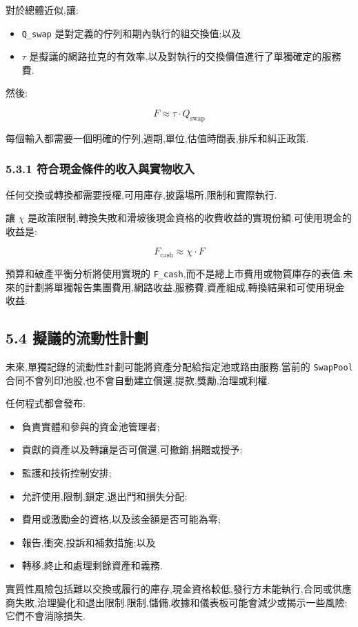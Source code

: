 \documentclass[11pt]{article}
\begin{document}
對於總體近似,讓:

\begin{itemize}[leftmargin=*]
\item \texttt{Q\_swap} 是對定義的佇列和期內執行的組交換值;以及
\item \texttt{$\tau$} 是擬議的網路拉克的有效率,以及對執行的交換價值進行了單獨確定的服務費.
\end{itemize}
然後:

\[
F \approx \tau \cdot Q_{\mathrm{swap}}
\]

每個輸入都需要一個明確的佇列,週期,單位,估值時間表,排斥和糾正政策.

\subsubsection*{5.3.1 符合現金條件的收入與實物收入}

任何交換或轉換都需要授權,可用庫存,披露場所,限制和實際執行.

讓 \texttt{$\chi$} 是政策限制,轉換失敗和滑坡後現金資格的收費收益的實現份額.可使用現金的收益是:

\[
F_{\mathrm{cash}} \approx \chi \cdot F
\]

預算和破產平衡分析將使用實現的 \texttt{F\_cash},而不是總上市費用或物質庫存的表值.未來的計劃將單獨報告集團費用,網路收益,服務費,資產組成,轉換結果和可使用現金收益.

\subsection*{5.4 擬議的流動性計劃}

未來,單獨記錄的流動性計劃可能將資產分配給指定池或路由服務.當前的 \texttt{SwapPool} 合同不會列印池股,也不會自動建立償還,提款,獎勵,治理或利權.

任何程式都會發布:

\begin{itemize}[leftmargin=*]
\item 負責實體和參與的資金池管理者;
\item 貢獻的資產以及轉讓是否可償還,可撤銷,捐贈或授予;
\item 監護和技術控制安排;
\item 允許使用,限制,鎖定,退出門和損失分配;
\item 費用或激勵金的資格,以及該金額是否可能為零;
\item 報告,衝突,投訴和補救措施;以及
\item 轉移,終止和處理剩餘資產和義務.
\end{itemize}
實質性風險包括難以交換或履行的庫存,現金資格較低,發行方未能執行,合同或供應商失敗,治理變化和退出限制.限制,儲備,收據和儀表板可能會減少或揭示一些風險;它們不會消除損失.
\end{document}
